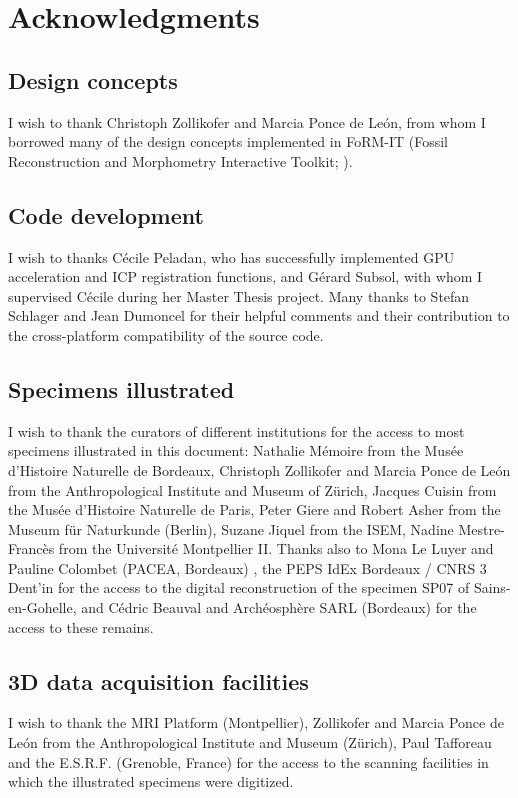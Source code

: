 
\chapter{Acknowledgments}
\minitoc 

\section {Design concepts}
I wish to thank Christoph Zollikofer and Marcia Ponce de León, from whom I borrowed many of the design concepts implemented in FoRM-IT (Fossil Reconstruction and Morphometry Interactive Toolkit; \citep{Zollikofer1995,Zollikofer2005}).

\section {Code development}
 I wish to thanks Cécile Peladan, who has successfully implemented GPU acceleration and ICP registration functions, and Gérard Subsol, with whom I supervised Cécile during her Master Thesis project. Many thanks to Stefan Schlager and Jean Dumoncel for their helpful comments and their contribution to the cross-platform compatibility of the source code.  

\section{Specimens illustrated} 
I wish to thank the curators of different institutions for the access to most specimens illustrated
in this document: Nathalie Mémoire from the Musée d'Histoire Naturelle de Bordeaux, Christoph
Zollikofer and Marcia Ponce de León from the Anthropological Institute and Museum of Zürich,
Jacques Cuisin from the Musée d’Histoire Naturelle de Paris, Peter Giere and Robert Asher from the
Museum für Naturkunde (Berlin), Suzane Jiquel from the ISEM, Nadine Mestre-Francès from the
Université Montpellier II. Thanks also to Mona Le Luyer and Pauline Colombet (PACEA, Bordeaux) ,
the PEPS IdEx Bordeaux / CNRS 3 Dent'in for the access to the digital reconstruction of the specimen
SP07 of Sains-en-Gohelle, and Cédric Beauval and Archéosphère SARL (Bordeaux) for the access to
these remains.

\section{3D data acquisition facilities} 
I wish to thank the MRI Platform (Montpellier), Zollikofer and Marcia Ponce de León from the
Anthropological Institute and Museum (Zürich), Paul Tafforeau and the E.S.R.F. (Grenoble, France) for
the access to the scanning facilities in which the illustrated specimens were digitized.
